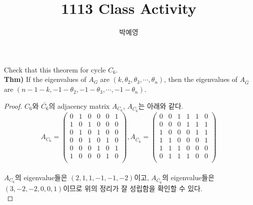 \documentclass[a4paper, 12pt]{article}
\title{1113 Class Activity}
\author{박예영}
\begin{document}
\maketitle
\begin{mdframed}
Check that this theorem for cycle $C_6$.\\
\textbf{Thm)} If the eigenvalues of $A_G$ are $(k, \theta_2, \theta_3, \cdots, \theta_n)$, then the eigenvalues of $A_{\bar{G}}$ are $(n-1-k, -1-\theta_2, -1-\theta_3,\cdots,-1-\theta_n)$.
\end{mdframed}

\begin{proof}
$C_6$와 $\bar{C_6}$의 adjacency matrix $A_{C_6}$, $A_{\bar{C_6}}$는 아래와 같다.
$$A_{C_6} = \begin{pmatrix} 0 & 1 & 0 & 0 & 0 & 1 \\ 1 & 0 & 1 & 0 & 0 & 0 \\ 0 & 1 & 0 & 1 & 0 & 0 \\ 0 & 0 & 1 & 0 & 1 & 0 \\ 0 & 0 & 0 & 1 & 0 & 1 \\ 1 & 0 & 0 & 0 & 1 & 0 \\ \end{pmatrix}, A_{\bar{C_6}} = \begin{pmatrix} 0 & 0 & 1 & 1 & 1 & 0 \\ 0 & 0 & 0 & 1 & 1 & 1 \\ 1 & 0 & 0 & 0 & 1 & 1 \\ 1 & 1 & 0 & 0 & 0 & 1 \\ 1 & 1 & 1 & 0 & 0 & 0 \\ 0 & 1 & 1 & 1 & 0 & 0 \\ \end{pmatrix}$$\\
$A_{C_6}$의 eigenvalue들은 $(2, 1, 1, -1, -1, -2)$이고, $A_{\bar{C_6}}$의 eigenvalue들은 $(3, -2, -2, 0, 0, 1)$이므로 위의 정리가 잘 성립함을 확인할 수 있다.\\
\newpage

\end{proof}
\end{document}
